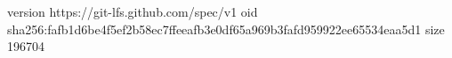 version https://git-lfs.github.com/spec/v1
oid sha256:fafb1d6be4f5ef2b58ec7ffeeafb3e0df65a969b3fafd959922ee65534eaa5d1
size 196704
